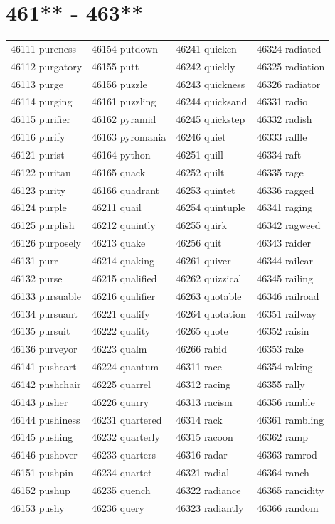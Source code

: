 \documentclass[10pt, oneside]{book}
\begin{document}
\begin{table}
	\centering
	\section*{461** - 463**}
	\begin{tabular}{l l l l}
46111 pureness &46154 putdown &46241 quicken &46324 radiated\\
46112 purgatory &46155 putt &46242 quickly &46325 radiation\\
46113 purge &46156 puzzle &46243 quickness &46326 radiator\\
46114 purging &46161 puzzling &46244 quicksand &46331 radio\\
46115 purifier &46162 pyramid &46245 quickstep &46332 radish\\
46116 purify &46163 pyromania &46246 quiet &46333 raffle\\
46121 purist &46164 python &46251 quill &46334 raft\\
46122 puritan &46165 quack &46252 quilt &46335 rage\\
46123 purity &46166 quadrant &46253 quintet &46336 ragged\\
46124 purple &46211 quail &46254 quintuple &46341 raging\\
46125 purplish &46212 quaintly &46255 quirk &46342 ragweed\\
46126 purposely &46213 quake &46256 quit &46343 raider\\
46131 purr &46214 quaking &46261 quiver &46344 railcar\\
46132 purse &46215 qualified &46262 quizzical &46345 railing\\
46133 pursuable &46216 qualifier &46263 quotable &46346 railroad\\
46134 pursuant &46221 qualify &46264 quotation &46351 railway\\
46135 pursuit &46222 quality &46265 quote &46352 raisin\\
46136 purveyor &46223 qualm &46266 rabid &46353 rake\\
46141 pushcart &46224 quantum &46311 race &46354 raking\\
46142 pushchair &46225 quarrel &46312 racing &46355 rally\\
46143 pusher &46226 quarry &46313 racism &46356 ramble\\
46144 pushiness &46231 quartered &46314 rack &46361 rambling\\
46145 pushing &46232 quarterly &46315 racoon &46362 ramp\\
46146 pushover &46233 quarters &46316 radar &46363 ramrod\\
46151 pushpin &46234 quartet &46321 radial &46364 ranch\\
46152 pushup &46235 quench &46322 radiance &46365 rancidity\\
46153 pushy &46236 query &46323 radiantly &46366 random\\
	\end{tabular}
 \end{table}
\clearpage
\end{document}
